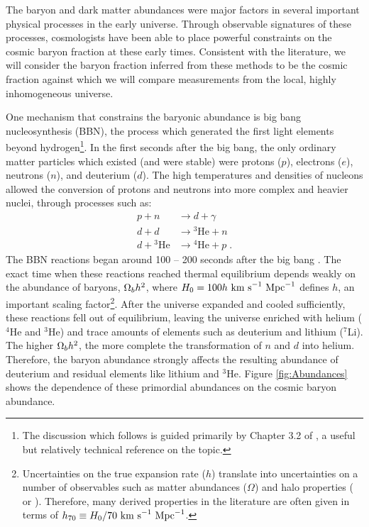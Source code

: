 The baryon and dark matter abundances were major factors in several
important physical processes in the early universe. Through observable
signatures of these processes, cosmologists have been able to place
powerful constraints on the cosmic baryon fraction at these early
times. Consistent with the literature, we will consider the baryon
fraction inferred from these methods to be the cosmic fraction against
which we will compare measurements from the local, highly
inhomogeneous universe.

One mechanism that constrains the baryonic abundance is big bang
nucleosynthesis (BBN), the process which generated the first light
elements beyond hydrogen\footnote{The discussion which follows is
  guided primarily by Chapter 3.2 of \citet{Weinberg2008}, a useful
  but relatively technical reference on the topic.}. In the first
seconds after the big bang, the only ordinary matter particles which
existed (and were stable) were protons ($p$), electrons ($e$),
neutrons ($n$), and deuterium ($d$). The high temperatures and densities of nucleons
allowed the conversion of protons and neutrons into more complex and
heavier nuclei, through processes such as:
\begin{align}
p + n &\rightarrow{} d + \gamma \nonumber \\
d + d &\rightarrow{} ^3\textrm{He} + n \nonumber \\
d +{} ^3\textrm{He} &\rightarrow{} ^4\textrm{He} + p\; .\nonumber
\end{align}
The BBN reactions began around 100 -- 200 seconds after the big bang
\citep{Weinberg2008}. The exact time when these reactions reached
thermal equilibrium depends weakly on the abundance of baryons,
$\Omega_b h^2$, where $H_0 = 100h~\textrm{km~s}^{-1}~\textrm{Mpc}^{-1}$ defines $h$, an important
scaling factor\footnote{Uncertainties on the true expansion rate ($h$)
  translate into uncertainties on a number of observables such as
  matter abundances ($\Omega$) and halo properties (\Mass{} or
  \radius{}). Therefore, many derived properties in the literature are
  often given in terms of $h_{70} \equiv{} H_0 / 70~\textrm{km~s}^{-1}~\textrm{Mpc}^{-1}$.}. After
the universe expanded and cooled sufficiently, these reactions fell
out of equilibrium, leaving the universe enriched with helium ($^4$He
and $^3$He) and trace amounts of elements such as deuterium and
lithium ($^7$Li). The higher $\Omega_b h^2$, the more complete the
transformation of $n$ and $d$ into helium. Therefore, the baryon
abundance strongly affects the resulting abundance of deuterium and
residual elements like lithium and $^3$He. Figure \ref{fig:Abundances}
shows the dependence of these primordial abundances on the cosmic
baryon abundance.

